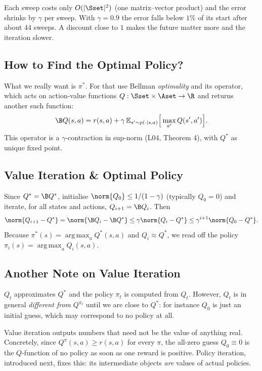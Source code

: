 \documentclass[11pt,a4paper]{article}
\newcommand{\E}{\mathbb{E}}
\DeclareMathOperator*{\argmax}{arg\,max}
\theoremstyle{plain}
\theoremstyle{definition}
\theoremstyle{remark}
\begin{document}
\begin{intuition}
Each sweep costs only $O(|\Sset|^2)$ (one matrix--vector product) and the error shrinks by $\gamma$ per sweep. With $\gamma=0.9$ the error falls below $1\%$ of its start after about $44$ sweeps. A discount close to $1$ makes the future matter more and the iteration slower.
\end{intuition}

\subsection{How to Find the Optimal Policy?}
What we really want is $\pi^*$. For that use Bellman \emph{optimality} and its operator, which acts on action-value functions $Q:\Sset\times\Aset\to\R$ and returns another such function:
\[
\B Q(s,a)=r(s,a)+\gamma\,\E_{s'\sim p(\cdot\mid s,a)}\Big[\max_{a'}Q(s',a')\Big].
\]
This operator is a $\gamma$-contraction in sup-norm (L04, Theorem 4), with $Q^*$ as unique fixed point.

\subsection{Value Iteration \& Optimal Policy}
Since $Q^*=\B Q^*$, initialise $\norm{Q_0}\le1/(1-\gamma)$ (typically $Q_0=0$) and iterate, for all states and actions, $Q_{i+1}=\B Q_i$. Then
\[
\norm{Q_{i+1}-Q^*}=\norm{\B Q_i-\B Q^*}\le\gamma\norm{Q_i-Q^*}\le\gamma^{i+1}\norm{Q_0-Q^*}.
\]
Because $\pi^*(s)=\argmax_aQ^*(s,a)$ and $Q_i\approx Q^*$, we read off the policy $\pi_i(s)=\argmax_aQ_i(s,a)$.

\subsection{Another Note on Value Iteration}
$Q_t$ approximates $Q^*$ and the policy $\pi_t$ is computed from $Q_t$. However, $Q_t$ is in general \emph{different from} $Q^{\pi_t}$ until we are close to $Q^*$: for instance $Q_0$ is just an initial guess, which may correspond to no policy at all.

\begin{intuition}
Value iteration outputs numbers that need not be the value of anything real. Concretely, since $Q^\pi(s,a)\ge r(s,a)$ for every $\pi$, the all-zero guess $Q_0\equiv0$ is the $Q$-function of no policy as soon as one reward is positive. Policy iteration, introduced next, fixes this: its intermediate objects \emph{are} values of actual policies.
\end{intuition}
\end{document}

